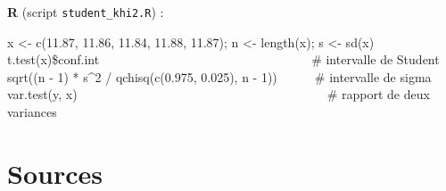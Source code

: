 \documentclass[11pt,a4paper]{article}
\theoremstyle{sj}
\theoremstyle{definition}
\theoremstyle{remark}
\begin{document}
\textbf{R} (script \texttt{student\_khi2.R}) :
\begin{code}
x <- c(11.87, 11.86, 11.84, 11.88, 11.87); n <- length(x); s <- sd(x)\\
t.test(x)\$conf.int\ \ \ \ \ \ \ \ \ \ \ \ \ \ \ \ \ \ \ \ \ \ \ \ \ \ \ \ \ \ \ \ \ \ \# intervalle de Student\\
sqrt((n - 1) * s\textasciicircum2 / qchisq(c(0.975, 0.025), n - 1))\ \ \ \ \ \ \# intervalle de sigma\\
var.test(y, x)\ \ \ \ \ \ \ \ \ \ \ \ \ \ \ \ \ \ \ \ \ \ \ \ \ \ \ \ \ \ \ \ \ \ \ \ \ \ \ \ \# rapport de deux variances
\end{code}

\section{Sources}
\end{document}
